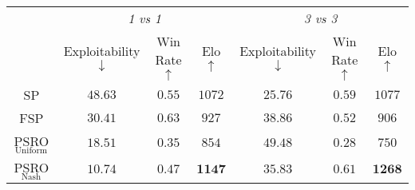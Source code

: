 \begin{tabular}{ccccccc}
\toprule
& \multicolumn{3}{c}{\textit{1 vs 1}}      & \multicolumn{3}{c}{\textit{3 vs 3}}     \\
& Exploitability $\downarrow$ & Win Rate $\uparrow$ & Elo $\uparrow$ & Exploitability $\downarrow$ & Win Rate $\uparrow$ & Elo $\uparrow$ \\
\midrule
SP     & $48.63$ & $0.55$ & $1072$ & $\bm{25.76}$ & $0.59$ & $1077$ \\
FSP    & $30.41$ & $\bm{0.63}$ & $927$ & $38.86$ & $0.52$ & $906$ \\
PSRO$_\text{Uniform}$ & $18.51$ & $0.35$ & $854$ & $49.48$ & $0.28$ & $750$ \\
PSRO$_\text{Nash}$ & $\bm{10.74}$ & $0.47$ & $\bm{1147}$ & $35.83$ & $\bm{0.61}$ & $\bm{1268}$ \\
\bottomrule 
\end{tabular}
